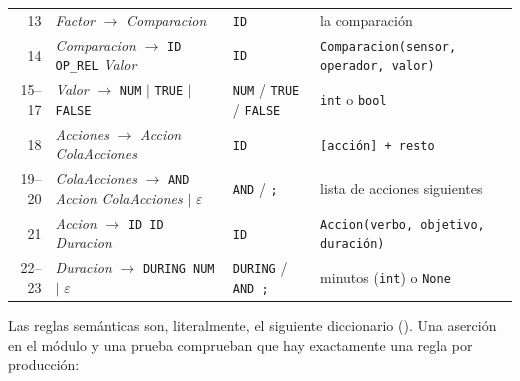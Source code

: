 \documentclass[11pt,letterpaper]{article}
\newcommand{\T}[1]{\texttt{#1}}
\newcommand{\NT}[1]{\textit{#1}}
\newcommand{\eps}{\ensuremath{\varepsilon}}
\newcommand{\flecha}{\ensuremath{\rightarrow}}
\newcommand{\archivomin}[1]{\begingroup\scriptsize\endgroup}
\begin{document}
\begin{longtable}{r>{\raggedright}p{6.0cm}>{\raggedright}p{2.8cm}>{\raggedright\arraybackslash}p{5.5cm}}
13 & \NT{Factor} \flecha{} \NT{Comparacion} & \T{ID} & la comparación\\
14 & \NT{Comparacion} \flecha{} \T{ID OP\_REL} \NT{Valor} & \T{ID} & \T{Comparacion(sensor, operador, valor)}\\
15--17 & \NT{Valor} \flecha{} \T{NUM} $\mid$ \T{TRUE} $\mid$ \T{FALSE} & \T{NUM} / \T{TRUE} / \T{FALSE} & \T{int} o \T{bool}\\
18 & \NT{Acciones} \flecha{} \NT{Accion} \NT{ColaAcciones} & \T{ID} & \T{[acción] + resto}\\
19--20 & \NT{ColaAcciones} \flecha{} \T{AND} \NT{Accion} \NT{ColaAcciones} $\mid$ \eps & \T{AND} / \T{;} & lista de acciones siguientes\\
21 & \NT{Accion} \flecha{} \T{ID ID} \NT{Duracion} & \T{ID} & \T{Accion(verbo, objetivo, duración)}\\
22--23 & \NT{Duracion} \flecha{} \T{DURING NUM} $\mid$ \eps & \T{DURING} / \T{AND ;} & minutos (\T{int}) o \T{None}\\\hline
\end{longtable}

Las reglas semánticas son, literalmente, el siguiente diccionario (\LineasExtractoSemantica). Una aserción en el
módulo y una prueba comprueban que hay exactamente una regla por producción:

\archivomin{generado/extracto_semantica.txt}
\end{document}
